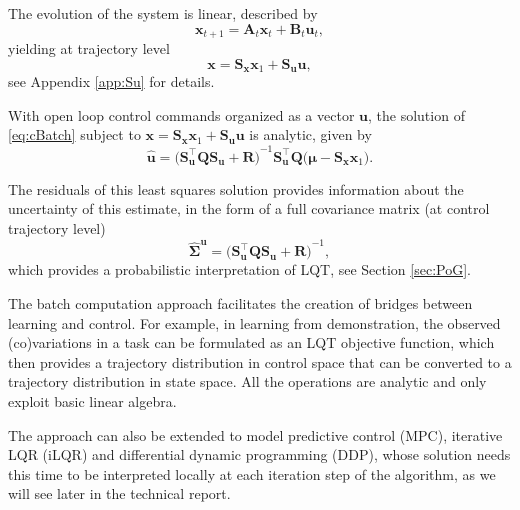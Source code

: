 \documentclass[10pt,a4paper]{article} %
\newcommand{\trsp}{{\scriptscriptstyle\top}}
\begin{document}
The evolution of the system is linear, described by 
\begin{equation}
	\bm{x}_{t+1} = \bm{A}_t \bm{x}_t + \bm{B}_t \bm{u}_t, 
	\label{eq:linSys}
\end{equation}
yielding at trajectory level
\begin{equation}
	\bm{x} = \bm{S}_{\bm{x}} \bm{x}_1 + \bm{S}_{\bm{u}} \bm{u}, 
	\label{eq:linSysTraj}
\end{equation}
see Appendix \ref{app:Su} for details.

With open loop control commands organized as a vector $\bm{u}$, the solution of \eqref{eq:cBatch} subject to $\bm{x}=\bm{S}_{\bm{x}}\bm{x}_1+\bm{S}_{\bm{u}}\bm{u}$ is analytic, given by
\begin{equation}
	\bm{\hat{u}} = {\big(\bm{S}_{\bm{u}}^\trsp \bm{Q} \bm{S}_{\bm{u}} + \bm{R}\big)}^{-1}
	\bm{S}_{\bm{u}}^\trsp \bm{Q} 
	\big(\bm{\mu} - \bm{S}_{\bm{x}} \bm{x}_1 \big).
	\label{eq:uLQT}
\end{equation}

The residuals of this least squares solution provides information about the uncertainty of this estimate, in the form of a full covariance matrix (at control trajectory level)
\begin{equation}
	\bm{\hat{\Sigma}}^{\bm{u}} = {\big(\bm{S}_{\bm{u}}^\trsp \bm{Q} \bm{S}_{\bm{u}} + \bm{R}\big)}^{-1},
	\label{eq:uSigma}
\end{equation}
which provides a probabilistic interpretation of LQT, see Section \ref{sec:PoG}.

The batch computation approach facilitates the creation of bridges between learning and control. For example, in learning from demonstration, the observed (co)variations in a task can be formulated as an LQT objective function, which then provides a trajectory distribution in control space that can be converted to a trajectory distribution in state space. All the operations are analytic and only exploit basic linear algebra.

The approach can also be extended to model predictive control (MPC), iterative LQR (iLQR) and differential dynamic programming (DDP), whose solution needs this time to be interpreted locally at each iteration step of the algorithm, as we will see later in the technical report.



\end{document}
